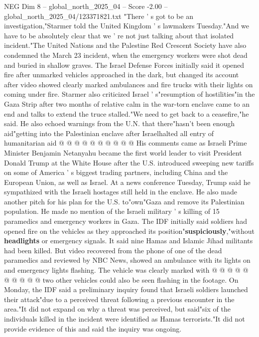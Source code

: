 \begin{textsample}{NEG Dim 8 – global\_north\_2025\_04 – Score -2.00 – global\_north\_2025\_04/123371821.txt}  \label{ex:f8_neg_085}
"There ' s got to be an investigation,"Starmer told the United Kingdom ' s lawmakers Tuesday."And we have to be absolutely clear that we ' re not just talking about that isolated incident."The United Nations and the Palestine Red Crescent Society have also condemned the March 23 incident, when the emergency workers were shot dead and buried in shallow graves.
The Israel Defense Forces initially said it opened fire after unmarked vehicles approached in the dark, but changed its account after video showed clearly marked ambulances and fire trucks with their lights on coming under fire.
Starmer also criticized Israel ' s"resumption of hostilities"in the Gaza Strip after two months of relative calm in the war-torn enclave came to an end and talks to extend the truce stalled."We need to get back to a ceasefire,"he said.
He also echoed warnings from the U.N. that there"hasn't been enough aid"getting into the Palestinian enclave after Israelhalted all entry of humanitarian aid @ @ @ @ @ @ @ @ @ @ His comments came as Israeli Prime Minister Benjamin Netanyahu became the first world leader to visit President Donald Trump at the White House after the U.S. introduced sweeping new tariffs on some of America ' s biggest trading partners, including China and the European Union, as well as Israel.
At a news conference Tuesday, Trump said he sympathized with the Israeli hostages still held in the enclave.
He also made another pitch for his plan for the U.S. to"own"Gaza and remove its Palestinian population.
He made no mention of the Israeli military ' s killing of 15 paramedics and emergency workers in Gaza.
The IDF initially said soldiers had opened fire on the vehicles as they approached its position"\textbf{suspiciously},"without \textbf{headlights} or emergency signals.
It said nine Hamas and Islamic Jihad militants had been killed.
But video recovered from the phone of one of the dead paramedics and reviewed by NBC News, showed an ambulance with its lights on and emergency lights flashing.
The vehicle was clearly marked with @ @ @ @ @ @ @ @ @ @ two other vehicles could also be seen flashing in the footage.
On Monday, the IDF said a preliminary inquiry found that Israeli soldiers launched their attack"due to a perceived threat following a previous encounter in the area."It did not expand on why a threat was perceived, but said"six of the individuals killed in the incident were identified as Hamas terrorists."It did not provide evidence of this and said the inquiry was ongoing.

\end{textsample}
